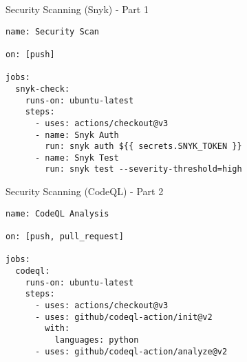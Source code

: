 \documentclass[aspectratio=169]{beamer}
\begin{document}

\begin{frame}[fragile]{Security Scanning (Snyk) - Part 1}
\begin{verbatim}
name: Security Scan

on: [push]

jobs:
  snyk-check:
    runs-on: ubuntu-latest
    steps:
      - uses: actions/checkout@v3
      - name: Snyk Auth
        run: snyk auth ${{ secrets.SNYK_TOKEN }}
      - name: Snyk Test
        run: snyk test --severity-threshold=high
\end{verbatim}
\end{frame}


\begin{frame}[fragile]{Security Scanning (CodeQL) - Part 2}
\begin{verbatim}
name: CodeQL Analysis

on: [push, pull_request]

jobs:
  codeql:
    runs-on: ubuntu-latest
    steps:
      - uses: actions/checkout@v3
      - uses: github/codeql-action/init@v2
        with:
          languages: python
      - uses: github/codeql-action/analyze@v2
\end{verbatim}
\end{frame}

\end{document}
